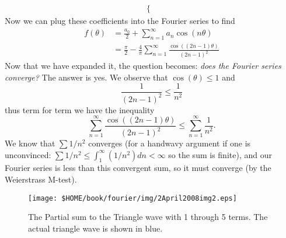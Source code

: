 \begin{ex}
\begin{subequations}
\begin{align}
\begin{cases}
\end{cases}
\end{align}
\end{subequations}
Now we can plug these coefficients into the Fourier series
to find
\begin{subequations}\label{eq:2April2008:fourierSeriesAbsoluteTheta}
\begin{align}
f(\theta) &= \frac{a_0}{2} +
\sum^{\infty}_{n=1}a_{n}\cos(n\theta) \\
&= \frac{\pi}{2} - \frac{4}{\pi}\sum^{\infty}_{n=1}\frac{\cos((2n-1)\theta)}{(2n-1)^2}
\end{align}
\end{subequations}
Now that we have expanded it, the question becomes:
\emph{does the Fourier series converge?} The answer is
yes. We observe that $\cos(\theta)\leq 1$ and 
\begin{equation}
\frac{1}{(2n-1)^2}\leq\frac{1}{n^2}
\end{equation}
thus term for term we have the inequality
\begin{equation}
\sum^{\infty}_{n=1}\frac{\cos((2n-1)\theta)}{(2n-1)^2} \leq \sum^{\infty}_{n=1}\frac{1}{n^2}.
\end{equation}
We know that $\sum 1/n^2$ converges (for a handwavy argument
if one is unconvinced: $\sum 1/n^2 \leq \int^{\infty}_{1}
(1/n^2)dn <\infty$ so the sum is finite), and our Fourier
series is less than this convergent sum, so it must converge
(by the Weierstrass M-test). 


\begin{figure}[h]
\texttt{[image: \$HOME/book/fourier/img/2April2008img2.eps]}
\caption[Partial Sums of Fourier Expansion of Triangle Wave]{The Partial sum to the Triangle wave with 1 through 5 terms. The actual triangle wave is shown in blue.}
\label{fig:2April2008:triangleWavePartialSum}
\end{figure}



\end{ex}
